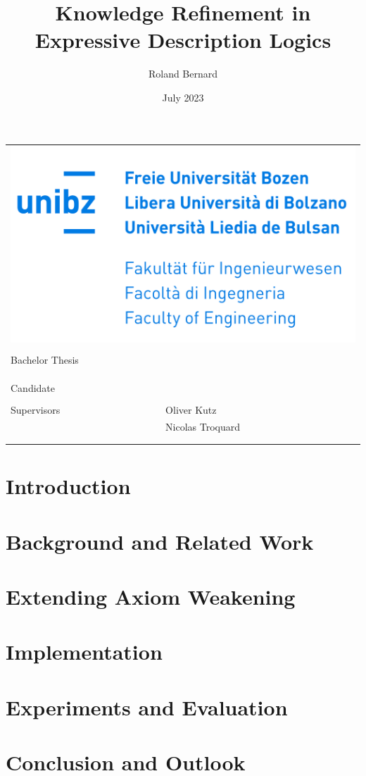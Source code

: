 \documentclass[10pt,a4paper]{report}
\title{Knowledge Refinement in Expressive Description Logics}
\author{Roland Bernard}
\date{July 2023}
\makeatletter
\theoremstyle{plain}
\theoremstyle{definition}
\theoremstyle{remark}
\def\maketitle{
  \thispagestyle{empty}
  \begin{tabular}{ll}
    \multicolumn{2}{r}{\includegraphics[width=0.5\linewidth]{resources/unibz-logo.png}} \\
    \vspace*{40mm} \\
    \multicolumn{2}{l}{\raggedright Bachelor Thesis} \\
    \vspace*{1mm} \\
    \multicolumn{2}{p{\linewidth}}{\raggedright \huge \bf \@title} \\
    \vspace*{30mm} \\
    Candidate   & \@author \\
    \vspace*{5mm} \\
    Supervisors & Oliver Kutz \\
                & Nicolas Troquard \\
    \vspace*{20mm} \\
    \multicolumn{2}{p{\linewidth}}{\@date}
  \end{tabular}
}
\makeatother
\begin{document}
\maketitle

\begin{abstract}
  
\end{abstract}

\tableofcontents
\thispagestyle{empty}

\begingroup
\renewcommand{\abstractname}{Acknowledgements}
\begin{abstract}
  
\end{abstract}
\endgroup

\chapter{Introduction} \label{introduction}



\chapter{Background and Related Work} \label{background}



\chapter{Extending Axiom Weakening} \label{theory}



\chapter{Implementation} \label{implementation}



\chapter{Experiments and Evaluation} \label{evaluation}



\chapter{Conclusion and Outlook} \label{conclusion}
\end{document}
